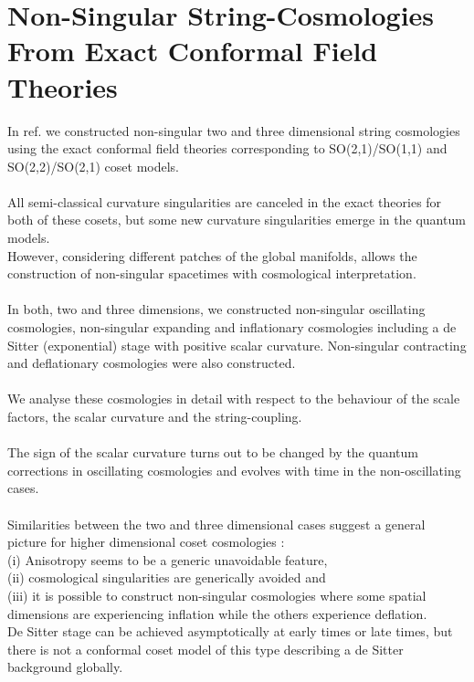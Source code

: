 \documentclass[12pt,a4paper]{article}
\begin{document}
\section{Non-Singular String-Cosmologies From Exact Conformal Field Theories}
In ref. \cite{vls} we constructed non-singular two and three dimensional string cosmologies  
using the exact conformal field theories corresponding to SO(2,1)/SO(1,1) and 
SO(2,2)/SO(2,1) coset models.\\ \\
All semi-classical curvature singularities are canceled in the exact theories 
for both of these cosets, but some new curvature singularities 
emerge in the quantum models.\\
However, considering different patches of the global manifolds, allows the 
construction of non-singular spacetimes with cosmological interpretation.\\ \\
In both, two and three dimensions, we constructed non-singular oscillating 
cosmologies, non-singular expanding and inflationary cosmologies including 
a de Sitter (exponential) stage with positive scalar curvature.  
Non-singular contracting and deflationary cosmologies were also constructed.\\ \\ 
We analyse these cosmologies in detail with respect to the behaviour of the 
scale factors, the scalar curvature and the string-coupling.\\ \\
The sign of the scalar curvature turns out to be changed by the quantum corrections in 
oscillating cosmologies and evolves with time in the non-oscillating cases.\\ 
\\
Similarities between the two and three dimensional cases suggest a general 
picture for higher dimensional coset cosmologies :\\
(i) Anisotropy seems to be a generic unavoidable feature,\\
(ii) cosmological singularities are generically avoided and \\
(iii) it is possible to construct non-singular cosmologies where some 
spatial dimensions are experiencing inflation while the others experience 
deflation.\\
De Sitter stage can be achieved asymptotically at early times or late 
times, but there is not a conformal coset model of this type describing a 
de Sitter background globally.
\end{document}
